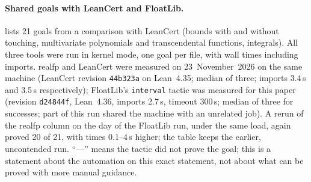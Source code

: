 \documentclass[11pt]{article}
\theoremstyle{definition}
\theoremstyle{remark}
\newcommand{\lean}[1]{\texttt{#1}}
\newcommand{\realfp}{\textsf{realfp}}
\begin{document}
\paragraph{Shared goals with LeanCert and FloatLib.}
 lists 21 goals from a comparison with LeanCert
(bounds with and without touching, multivariate polynomials and
transcendental functions, integrals). All three tools were run in kernel
mode, one goal per file, with wall times including imports. \realfp{} and
LeanCert were measured on 23~November~2026 on the same machine (LeanCert
revision \lean{44b323a} on Lean~4.35; median of three; imports 3.4\,s and
3.5\,s respectively); FloatLib's \lean{interval} tactic was measured for this
paper (revision \lean{d24844f}, Lean~4.36, imports 2.7\,s, timeout
300\,s; median of three for successes; part of this run shared the machine
with an unrelated job). A rerun of the \realfp{} column on the day of the
FloatLib run, under the same load, again proved 20 of 21, with times
0.1--4\,s higher; the table keeps the earlier, uncontended run. ``---'' means the tactic did not prove the goal; this is a
statement about the automation on this exact statement, not about what can be
proved with more manual guidance.
\end{document}
